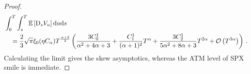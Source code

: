 \begin{proof}
\begin{align*}
    &\int_0^T \int_s^T\mathbb{E}\left[\mathrm{D}_s V_u\right]\mathrm{d} u \mathrm{d} s \\
    & \quad = \frac{2}{3}\sqrt{\pi} \xi_0 (\eta C_\alpha) T^{\frac{\alpha +3}{2}} \left(\frac{3 C_0^1}{\alpha ^2+4 \alpha +3}+\frac{C_1^1}{(\alpha +1)^2} T^{\alpha } + \frac{3 C_2^1}{5 \alpha ^2+8 \alpha +3} T^{2 \alpha } + \mathcal{O}\left(T^{3\alpha}\right)\right)\,.
\end{align*}
Calculating the limit gives the skew asymptotics, whereas the ATM level of SPX smile is immediate.
\end{proof}


